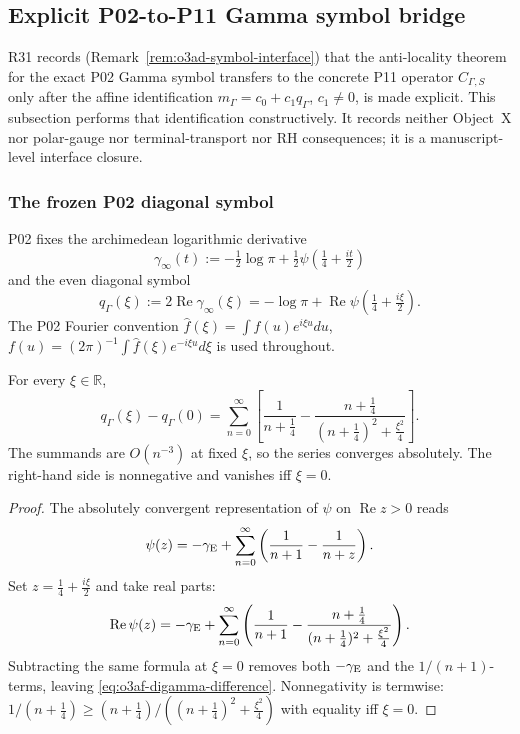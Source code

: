 
\newtheorem{definition}[theorem]{Definition}

\subsection{Explicit P02-to-P11 Gamma symbol bridge}
\label{subsec:o3af-symbol-bridge}

R31 records (Remark~\ref{rem:o3ad-symbol-interface}) that the anti-locality
theorem for the exact P02 Gamma symbol transfers to the concrete P11 operator
\(C_{\Gamma,S}\) only after the affine identification
\(m_\Gamma=c_0+c_1q_\Gamma\), \(c_1\ne0\), is made explicit.  This subsection
performs that identification constructively.  It records neither Object~X nor
polar-gauge nor terminal-transport nor RH consequences; it is a manuscript-
level interface closure.

\subsubsection*{The frozen P02 diagonal symbol}

P02 fixes the archimedean logarithmic derivative
\[
 \gamma_\infty(t)
 :=-\tfrac12\log\pi
 +\tfrac12\psi\!\left(\tfrac14+\tfrac{it}{2}\right)
\]
and the even diagonal symbol
\[
 q_\Gamma(\xi)
 :=2\operatorname{Re}\gamma_\infty(\xi)
 =-\log\pi
 +\operatorname{Re}\psi\!\left(\tfrac14+\tfrac{i\xi}{2}\right).
\tag{O3AF.1}\label{eq:o3af-qgamma-def}
\]
The P02 Fourier convention
\(\widehat f(\xi)=\int f(u)e^{i\xi u}du\),
\(f(u)=(2\pi)^{-1}\!\int\widehat f(\xi)e^{-i\xi u}d\xi\)
is used throughout.

\begin{lemma}
\label{lem:o3af-digamma-difference}
For every \(\xi\in\mathbb R\),
\[
 \boxed{
 q_\Gamma(\xi)-q_\Gamma(0)
 =\sum_{n=0}^\infty
 \left[\frac1{n+\tfrac14}-\frac{n+\tfrac14}{(n+\tfrac14)^2+\tfrac{\xi^2}{4}}\right].
 }
\tag{O3AF.2}\label{eq:o3af-digamma-difference}
\]
The summands are \(O(n^{-3})\) at fixed \(\xi\), so the series converges
absolutely.  The right-hand side is nonnegative and vanishes iff \(\xi=0\).
\end{lemma}

\begin{proof}
The absolutely convergent representation of \(\psi\) on
\(\operatorname{Re}z>0\) reads
\[
 \psi(z)=-\gamma_{\rm E}+\sum_{n=0}^\infty
 \left(\frac1{n+1}-\frac1{n+z}\right).
\]
Set \(z=\tfrac14+\tfrac{i\xi}{2}\) and take real parts:
\[
 \operatorname{Re}\psi(z)
 =-\gamma_{\rm E}+\sum_{n=0}^\infty
 \left(\frac1{n+1}-\frac{n+\tfrac14}{(n+\tfrac14)^2+\tfrac{\xi^2}{4}}\right).
\]
Subtracting the same formula at \(\xi=0\) removes both \(-\gamma_{\rm E}\)
and the \(1/(n+1)\)-terms, leaving \eqref{eq:o3af-digamma-difference}.
Nonnegativity is termwise:
\(1/(n+\tfrac14)\ge(n+\tfrac14)/((n+\tfrac14)^2+\tfrac{\xi^2}{4})\)
with equality iff \(\xi=0\).
\end{proof}

